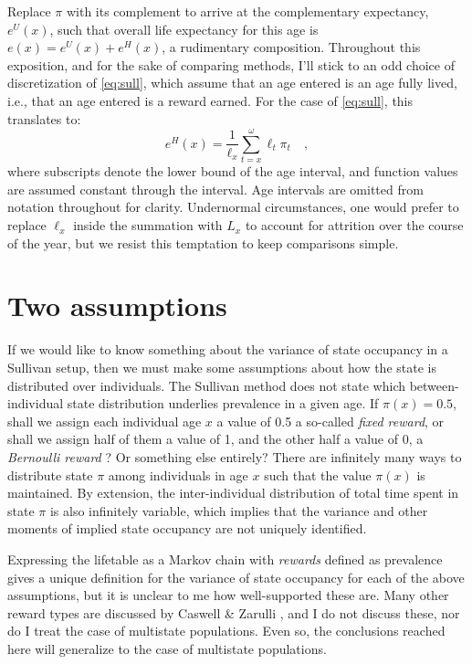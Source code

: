 \documentclass{bmcart}
\begin{document}
Replace $\pi$ with its complement to arrive at the complementary expectancy, $e^U(x)$, such that overall life expectancy for this age is $e(x) = e^U(x) + e^H(x)$, a rudimentary composition. Throughout this exposition, and for the sake of comparing methods, I'll stick to an odd choice of discretization of \ref{eq:sull}, which assume that an age entered is an age fully lived, i.e., that an age entered is a reward earned. For the case of \eqref{eq:sull}, this translates to:
\begin{equation}
\label{eq:sulldisc}
e^H(x) = \frac{1}{\ell_x} \sum_{t=x}^\omega \ell_t\pi_t \quad \mathrm{,}
\end{equation}
where subscripts denote the lower bound of the age interval, and function values are assumed constant through the interval. Age intervals are omitted from notation throughout for clarity. Undernormal circumstances, one would prefer to replace $\ell_x$ inside the summation with $L_x$ to account for attrition over the course of the year, but we resist this temptation to keep comparisons simple.

\section*{Two assumptions}
If we would like to know something about the variance of state occupancy in a Sullivan setup, then we must make some assumptions about how the state is distributed over individuals. The Sullivan method does not state which between-individual state distribution underlies prevalence in a given age. If $\pi(x) = 0.5$, shall we assign each individual age $x$ a value of 0.5 a so-called \emph{fixed reward}, or shall we assign half of them a value of 1, and the other half a value of 0, a \emph{Bernoulli reward} \citep{caswell2018matrix}? Or something else entirely? There are infinitely many ways to distribute state $\pi$ among individuals in age $x$ such that the value $\pi(x)$ is maintained. By extension, the inter-individual distribution of total time spent in state $\pi$ is also infinitely variable, which implies that the variance and other moments of implied state occupancy are not uniquely identified. 

Expressing the lifetable as a Markov chain with \emph{rewards} defined as prevalence gives a unique definition for the variance of state occupancy for each of the above assumptions, but it is unclear to me how well-supported these are. Many other reward types are discussed by Caswell \& Zarulli \cite{caswell2018matrix}, and I do not discuss these, nor do I treat the case of multistate populations. Even so, the conclusions reached here will generalize to the case of multistate populations.
\end{document}
